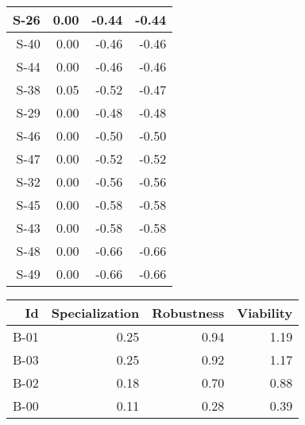 \begin{tabular}{ | r | r | r | r | }
    \hline
                  S-26  &            0.00  &           -0.44  &           -0.44  \\
    \hline
                  S-40  &            0.00  &           -0.46  &           -0.46  \\
    \hline
                  S-44  &            0.00  &           -0.46  &           -0.46  \\
    \hline
                  S-38  &            0.05  &           -0.52  &           -0.47  \\
    \hline
                  S-29  &            0.00  &           -0.48  &           -0.48  \\
    \hline
                  S-46  &            0.00  &           -0.50  &           -0.50  \\
    \hline
                  S-47  &            0.00  &           -0.52  &           -0.52  \\
    \hline
                  S-32  &            0.00  &           -0.56  &           -0.56  \\
    \hline
                  S-45  &            0.00  &           -0.58  &           -0.58  \\
    \hline
                  S-43  &            0.00  &           -0.58  &           -0.58  \\
    \hline
                  S-48  &            0.00  &           -0.66  &           -0.66  \\
    \hline
                  S-49  &            0.00  &           -0.66  &           -0.66  \\
    \hline
\end{tabular}


\begin{tabular}{ | r | r | r | r | }
    \hline
                    Id  &  Specialization  &      Robustness  &       Viability  \\
    \hline
    \hline
                  B-01  &            0.25  &            0.94  &            1.19  \\
    \hline
                  B-03  &            0.25  &            0.92  &            1.17  \\
    \hline
                  B-02  &            0.18  &            0.70  &            0.88  \\
    \hline
                  B-00  &            0.11  &            0.28  &            0.39  \\
    \hline
\end{tabular}


